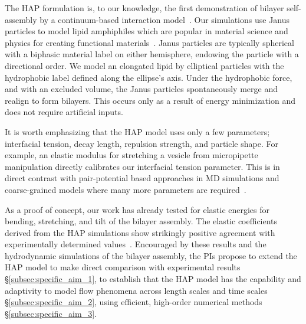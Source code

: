 The HAP formulation is, to our knowledge, the first demonstration of
bilayer self-assembly by a continuum-based interaction
model~\cite{Noguchi2001, Farago2003, Brannigan2006, Brooks2009,
Wang2013}. Our simulations use Janus particles to model lipid
amphiphiles which are popular in material science and physics for
creating functional materials~\cite{Lee2014, Lee2013}. Janus particles
are typically spherical with a biphasic material label on either
hemisphere, endowing the particle with a directional order. We model an
elongated lipid by elliptical particles with the hydrophobic label
defined along the ellipse's axis. Under the hydrophobic force, and with
an excluded volume, the Janus particles spontaneously merge and realign
to form bilayers. This occurs only as a result of energy minimization
and does not require artificial inputs.

It is worth emphasizing that the HAP model uses only a few parameters;
interfacial tension, decay length, repulsion strength, and particle
shape. For example, an elastic modulus for stretching a vesicle from
micropipette manipulation directly calibrates our interfacial tension
parameter. This is in direct contrast with pair-potential based
approaches in MD simulations and coarse-grained models where many more
parameters are required~\cite{Varilly2011, Wang2013}.

As a proof of concept, our work has already tested for elastic energies
for bending, stretching, and tilt of the bilayer assembly.  The elastic
coefficients derived from the HAP simulations show strikingly positive
agreement with experimentally determined values~\cite{Fu2018_SIAM}.
Encouraged by these results and the hydrodynamic simulations of the
bilayer assembly, the PIs propose to extend the HAP model to make direct
comparison with experimental results  \S\ref{subsec:specific_aim_1}, to
establish that the HAP model has the capability and adaptivity to model
flow phenomena across length scales and time scales
\S\ref{subsec:specific_aim_2}, using efficient, high-order numerical
methods \S\ref{subsec:specific_aim_3}.

